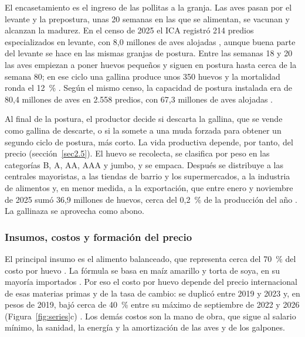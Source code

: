 \documentclass[preprint,12pt,authoryear]{elsarticle}
\begin{document}
El encasetamiento es el ingreso de las pollitas a la granja. Las aves pasan por el levante y la prepostura, unas 20 semanas en las que se alimentan, se vacunan y alcanzan la madurez. En el censo de 2025 el ICA registró 214 predios especializados en levante, con 8,0 millones de aves alojadas \citep{ICA2025Censo}, aunque buena parte del levante se hace en las mismas granjas de postura. Entre las semanas 18 y 20 las aves empiezan a poner huevos pequeños y siguen en postura hasta cerca de la semana 80; en ese ciclo una gallina produce unos 350 huevos y la mortalidad ronda el 12~\% \citep{Fenavi2026Fenaviquin440}. Según el mismo censo, la capacidad de postura instalada era de 80,4 millones de aves en 2.558 predios, con 67,3 millones de aves alojadas \citep{ICA2025Censo}.

Al final de la postura, el productor decide si descarta la gallina, que se vende como gallina de descarte, o si la somete a una muda forzada para obtener un segundo ciclo de postura, más corto. La vida productiva depende, por tanto, del precio (sección~\ref{sec2.5}). El huevo se recolecta, se clasifica por peso en las categorías B, A, AA, AAA y jumbo, y se empaca. Después se distribuye a las centrales mayoristas, a las tiendas de barrio y los supermercados, a la industria de alimentos y, en menor medida, a la exportación, que entre enero y noviembre de 2025 sumó 36,9 millones de huevos, cerca del 0,2~\% de la producción del año \citep{Fenavi2026Rueda}. La gallinaza se aprovecha como abono.

\subsubsection{Insumos, costos y formación del precio}

El principal insumo es el alimento balanceado, que representa cerca del 70~\% del costo por huevo \citep{Fenavi2026Fenaviquin456}. La fórmula se basa en maíz amarillo y torta de soya, en su mayoría importados \citep{USDAFAS2025}. Por eso el costo por huevo depende del precio internacional de esas materias primas y de la tasa de cambio: se duplicó entre 2019 y 2023 y, en pesos de 2019, bajó cerca de 40~\% entre su máximo de septiembre de 2022 y 2026 (Figura~\ref{fig:series}c) \citep{Fenavi2026Costos}. Los demás costos son la mano de obra, que sigue al salario mínimo, la sanidad, la energía y la amortización de las aves y de los galpones.
\end{document}
